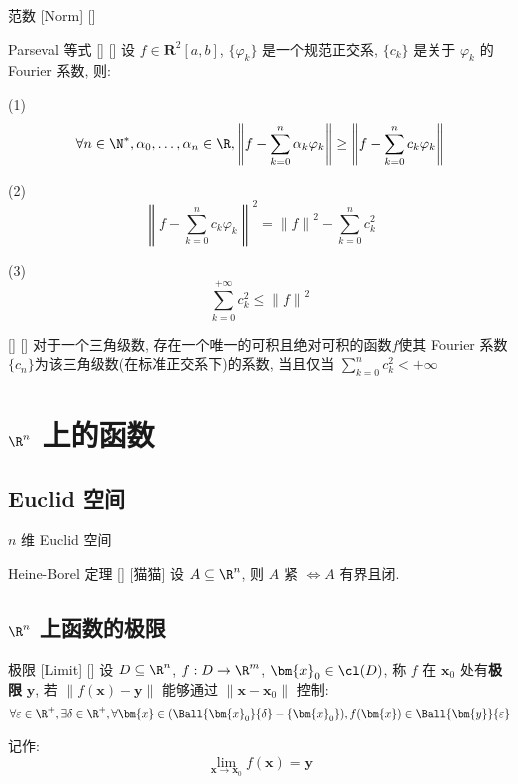 \documentclass[UTF8]{ctexart}
\begin{document}
			\begin{dfn}
                    []
                    {范数}
                    [Norm]
                    []
			\end{dfn}

			\begin{thm}
			    []
			    {Parseval 等式}
			    []
			    []
				设 \(f\in\mathbf{R}^2[a,b]\), \(\{\varphi_k\}\) 是一个规范正交系, \(\{c_k\}\) 是关于 \(\varphi_k\) 的 Fourier 系数, 则: 
				
				(1)
				\[\forall n\in\N^*, \alpha_0,\dots,\alpha_n\in\R, \left\|f-\sum_{k=0}^{n}\alpha_k\varphi_k\right\|\geq\left\|f-\sum_{k=0}^{n}c_k\varphi_k\right\|\]

				(2)
				\[{\left\|f-\sum_{k=0}^{n}c_k\varphi_k\right\|}^2={\|f\|}^2-\sum_{k=0}^{n}c_k^2\]

				(3)
				\[\sum_{k=0}^{+\infty}c_k^2\leq{\|f\|}^2\]
			\end{thm}

			\begin{crl}
			    []
			    {}
			    []
			    []
				对于一个三角级数, 存在一个唯一的可积且绝对可积的函数\(f\)使其 Fourier 系数\(\{c_n\}\)为该三角级数(在标准正交系下)的系数, 当且仅当 \(\sum_{k=0}^{n}c_k^2<+\infty\)
			\end{crl}

    \section{\(\R^n\) 上的函数}

		\subsection{Euclid 空间}
			
			\begin{dfn}
				{\(n\) 维 Euclid 空间}
			\end{dfn}

			\begin{thm}
				[]
				{Heine-Borel 定理}
				[]
				[猫猫]
				设 \(A\subseteq\R^n\), 则 \(A\) 紧 \(\iff A\) 有界且闭. 
			\end{thm}

		\subsection{\(\R^n\) 上函数的极限}
			
			\begin{dfn}
			    []
			    {极限}
			    [Limit]
			    []
				设 \(D\subseteq\R^n\), \(f:D\to\R^m\), \(\bm{x}_0\in\cl(D)\), 称 \(f\) 在 \(\bm{x}_0\) 处有\textbf{极限} \(\bm{y}\), 若 \(\|f(\bm{x})-\bm{y}\|\) 能够通过 \(\|\bm{x}-\bm{x}_0\|\) 控制: 
				\[\forall\varepsilon\in\R^+, \exists\delta\in\R^+, \forall\bm{x}\in(\Ball{\bm{x}_0}{\delta}-\{\bm{x}_0\}), f(\bm{x})\in\Ball{\bm{y}}{\varepsilon}\]
				
				记作: 
				\[\lim_{\bm{x}\to\bm{x}_0}f(\bm{x})=\bm{y}\]
			\end{dfn}
\end{document}

